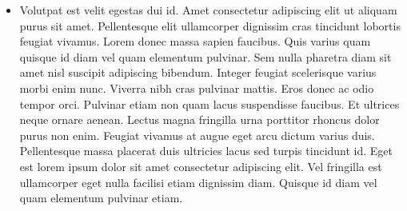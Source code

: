 \documentclass[article]{seminar}
\begin{document}
\label{BAR}

\begin{itemize}
\item Volutpat est velit egestas dui id. Amet consectetur adipiscing elit ut
aliquam purus sit amet. Pellentesque elit ullamcorper dignissim cras tincidunt
lobortis feugiat vivamus. Lorem donec massa sapien faucibus. Quis varius quam
quisque id diam vel quam elementum pulvinar. Sem nulla pharetra diam sit amet
nisl suscipit adipiscing bibendum. Integer feugiat scelerisque varius morbi enim
nunc. Viverra nibh cras pulvinar mattis. Eros donec ac odio tempor orci.
Pulvinar etiam non quam lacus suspendisse faucibus. Et ultrices neque ornare
aenean. Lectus magna fringilla urna porttitor rhoncus dolor purus non enim.
Feugiat vivamus at augue eget arcu dictum varius duis. Pellentesque massa
placerat duis ultricies lacus sed turpis tincidunt id. Eget est lorem ipsum
dolor sit amet consectetur adipiscing elit. Vel fringilla est ullamcorper eget
nulla facilisi etiam dignissim diam. Quisque id diam vel quam elementum pulvinar
etiam.
\end{itemize}
\end{document}
